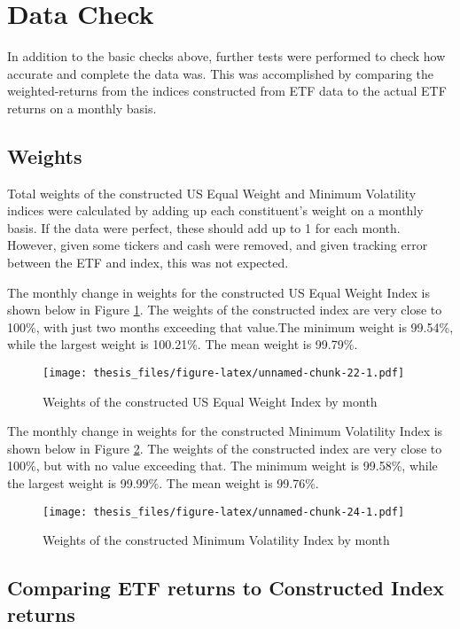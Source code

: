 \documentclass[12pt,twoside]{reedthesis}
\theoremstyle{definition}
\theoremstyle{definition}
\theoremstyle{definition}
\theoremstyle{remark}
\begin{document}
\section{Data Check}\label{data-check}

In addition to the basic checks above, further tests were performed to
check how accurate and complete the data was. This was accomplished by
comparing the weighted-returns from the indices constructed from ETF
data to the actual ETF returns on a monthly basis.

\subsection{Weights}\label{weights}

Total weights of the constructed US Equal Weight and Minimum Volatility
indices were calculated by adding up each constituent's weight on a
monthly basis. If the data were perfect, these should add up to 1 for
each month. However, given some tickers and cash were removed, and given
tracking error between the ETF and index, this was not expected.

The monthly change in weights for the constructed US Equal Weight Index
is shown below in Figure \ref{fig:plot1}. The weights of the constructed
index are very close to 100\%, with just two months exceeding that
value.The minimum weight is 99.54\%, while the largest weight is
100.21\%. The mean weight is 99.79\%.
\begin{figure}[htbp]
\centering
\texttt{[image: thesis\_files/figure-latex/unnamed-chunk-22-1.pdf]}
\caption{\label{fig:unnamed-chunk-22}Weights of the constructed US Equal
Weight Index by month\label{fig:plot1}}
\end{figure}
\newline

The monthly change in weights for the constructed Minimum Volatility
Index is shown below in Figure \ref{fig:plot2}. The weights of the
constructed index are very close to 100\%, but with no value exceeding
that. The minimum weight is 99.58\%, while the largest weight is
99.99\%. The mean weight is 99.76\%.
\begin{figure}[htbp]
\centering
\texttt{[image: thesis\_files/figure-latex/unnamed-chunk-24-1.pdf]}
\caption{\label{fig:unnamed-chunk-24}Weights of the constructed Minimum
Volatility Index by month\label{fig:plot2}}
\end{figure}
\subsection{Comparing ETF returns to Constructed Index
returns}\label{comparing-etf-returns-to-constructed-index-returns}
\end{document}
